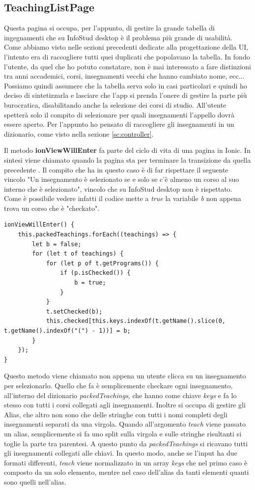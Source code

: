 \documentclass[Lau, oneside, noexaminfo]{sapthesis}%
\begin{document}
\subsection{TeachingListPage}
Questa pagina si occupa, per l'appunto, di gestire la grande tabella di ingegnamenti che su InfoStud desktop è il problema più grande di usabilità. Come abbiamo visto nelle sezioni precedenti dedicate alla progettazione della UI, l'intento era di raccogliere tutti quei duplicati che popolavano la tabella. In fondo l'utente, da quel che ho potuto constatare, non è mai interessato a fare distinzioni tra anni accademici, corsi, insegnamenti vecchi che hanno cambiato nome, ecc... Possiamo quindi assumere che la tabella serva solo in casi particolari e quindi ho deciso di sintetizzarla e lasciare che l'app si prenda l'onere di gestire la parte più burocratica, disabilitando anche la selezione dei corsi di studio. All'utente spetterà solo il compito di selezionare per quali insegnamenti l'appello dovrà essere aperto. Per l'appunto ho pensato di raccogliere gli insegnamenti in un dizionario, come visto nella sezione \ref{sc:controller}.

Il metodo \textbf{ionViewWillEnter} fa parte del ciclo di vita di una pagina in Ionic. In sintesi viene chiamato quando la pagina sta per terminare la transizione da quella precedente \cite{ref:ionicViewLifeCycle}. Il compito che ha in questo caso è di far rispettare il seguente vincolo "Un insegnamento è selezionato se e solo se c'è almeno un corso al suo interno che è selezionato", vincolo che su InfoStud desktop non è rispettato. Come è possibile vedere infatti il codice mette a \textit{true} la variabile \textit{b} non appena trova un corso che è "checkato".

\begin{lstlisting}
ionViewWillEnter() {
	this.packedTeachings.forEach((teachings) => {
		let b = false;
		for (let t of teachings) {
			for (let p of t.getPrograms()) {
				if (p.isChecked()) {
					b = true;
				}
			}
			t.setChecked(b);
			this.checked[this.keys.indexOf(t.getName().slice(0, t.getName().indexOf("(") - 1))] = b;
		}
	});
}
\end{lstlisting}

Questo metodo viene chiamato non appena un utente clicca su un insegnamento per selezionarlo. Quello che fa è semplicemente checkare ogni insegnamento, all'interno del dizionario \textit{packedTeachings}, che hanno come chiave \textit{keys} e fa lo stesso con tutti i corsi collegati agli insegnamenti. Inoltre si occupa di gestire gli Alias, che altro non sono che delle stringhe con tutti i nomi completi degli insegnamenti separati da una virgola. Quando all'argomento \textit{teach} viene passato un alias, semplicemente si fa uno split sulla virgola e sulle stringhe risultanti si toglie la parte tra parentesi. A questo punto da \textit{packedTeachings} si ricavano tutti gli insegnamenti collegati alle chiavi. In questo modo, anche se l'input ha due formati differenti, \textit{teach} viene normalizzato in un array \textit{keys} che nel primo caso è composto da un solo elemento, mentre nel caso dell'alias da tanti elementi quanti sono quelli nell'alias.
\end{document}
